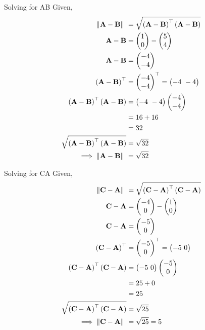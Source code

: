 \documentclass[11pt]{book}
\begin{document}
\begin{enumerate}[label=\thesection.\arabic*.,ref=\thesection.\theenumi]
Solving for AB 
Given, 
\begin{align}  
 \norm{\vec{A}-\vec{B}}\ &=  \sqrt{\brak{\vec{A}-\vec{B}}^{\top}\brak{\vec{A}-\vec{B}}} \\
 \vec{A}-\vec{B} &= \myvec{1 \\ 0} - \myvec{5 \\ 4} \\
 \vec{A}-\vec{B} &= \myvec{-4 \\ -4} \\
 \brak{\vec{A}-\vec{B}}^{\top} &= {\myvec{-4 \\ -4}}^{\top} = \myvec{-4 \ -4} \\
\brak{\vec{A}-\vec{B}}^{\top}\brak{\vec{A}-\vec{B}} &= \myvec{-4 \ -4} \myvec{-4 \\ -4}\\
             &= 16 + 16 \\
             &= 32 \\  
	\sqrt{\brak{\vec{A}-\vec{B}}^{\top}\brak{\vec{A}-\vec{B}}} &= \sqrt{32}	\\
	\implies \norm{\vec{A}-\vec{B}}\ &= \sqrt{32} 
\end{align}

Solving for CA
Given, 
\begin{align}  
	\norm{\vec{C}-\vec{A}}\ &=  \sqrt{\brak{\vec{C}-\vec{A}}^{\top}\brak{\vec{C}-\vec{A}}} \\
 \vec{C}-\vec{A} &= \myvec{-4 \\ 0} - \myvec{1 \\ 0} \\
 \vec{C}-\vec{A} &= \myvec{-5 \\ 0} \\
 \brak{\vec{C}-\vec{A}}^{\top} &= {\myvec{-5 \\ 0}}^{\top} = \myvec{-5 \ 0} \\
	\brak{\vec{C}-\vec{A}}^{\top}\brak{\vec{C}-\vec{A}} &= \myvec{-5 \ 0} \myvec{-5 \\ 0}\\
             &= 25 + 0 \\
             &= 25 \\  
	\sqrt{\brak{\vec{C}-\vec{A}}^{\top}\brak{\vec{C}-\vec{A}}} &= \sqrt{25}	\\
	\implies \norm{\vec{C}-\vec{A}}\ &= \sqrt{25} =5
\end{align}




\end{enumerate}
\end{document}
